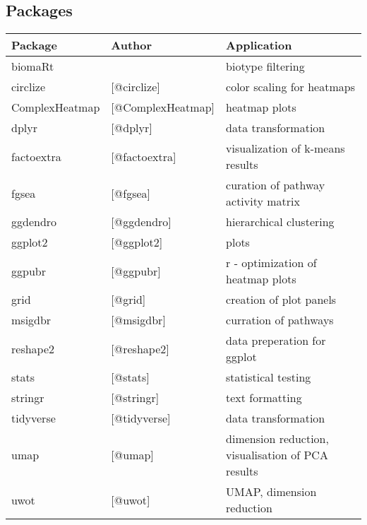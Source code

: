 \documentclass[
  parskip,
  oneside]{\documentclass[oneside]{book}}
\begin{document}
\hypertarget{packages-1}{%
\subsection{Packages}\label{packages-1}}

\begin{table}[!ht]
    \centering
    \begin{tabular}{|l|l|l|}
    \hline
        Package & Author & Application \\ \hline
        biomaRt &{\cite{@BioMart}}& biotype filtering  \\ \hline
        circlize & [@circlize] & color scaling for heatmaps  \\ \hline
        ComplexHeatmap & [@ComplexHeatmap] & heatmap plots  \\ \hline
        dplyr & [@dplyr] & data transformation  \\ \hline
        factoextra & [@factoextra] & visualization of k-means results  \\ \hline
        fgsea & [@fgsea] & curation of pathway activity matrix  \\ \hline
        ggdendro & [@ggdendro] & hierarchical clustering  \\ \hline
        ggplot2 & [@ggplot2] & plots  \\ \hline
        ggpubr & [@ggpubr] & r - optimization of heatmap plots  \\ \hline
        grid & [@grid] & creation of plot panels  \\ \hline
        msigdbr & [@msigdbr] & curration of pathways  \\ \hline
        reshape2 & [@reshape2] & data preperation for ggplot  \\ \hline
        stats & [@stats] & statistical testing  \\ \hline
        stringr & [@stringr] & text formatting  \\ \hline
        tidyverse & [@tidyverse] & data transformation  \\ \hline
        umap & [@umap] & dimension reduction, visualisation of PCA results  \\ \hline
        uwot & [@uwot] & UMAP, dimension reduction  \\ \hline
    \end{tabular}
\end{table}
\end{document}
